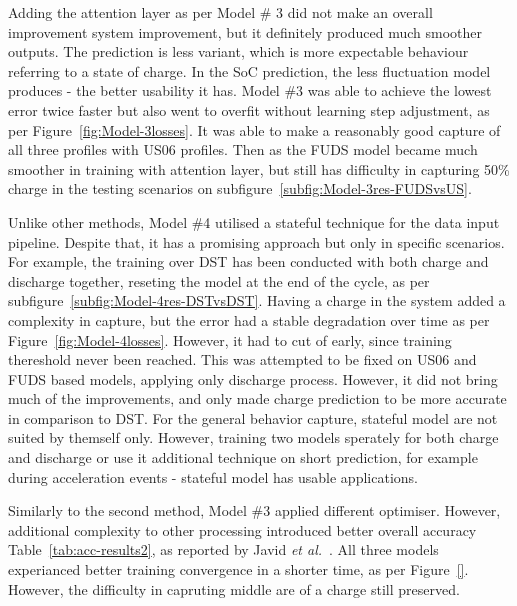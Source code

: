 %
%
Adding the attention layer as per Model \# 3 did not make an overall improvement system improvement, but it definitely produced much smoother outputs.
The prediction is less variant, which is more expectable behaviour referring to a state of charge.
In the SoC prediction, the less fluctuation model produces - the better usability it has.
Model \#3 was able to achieve the lowest error twice faster but also went to overfit without learning step adjustment, as per Figure~\ref{fig:Model-3losses}.
It was able to make a reasonably good capture of all three profiles with US06 profiles.
Then as the FUDS model became much smoother in training with attention layer, but still has difficulty in capturing 50\% charge in the testing scenarios on subfigure~\ref{subfig:Model-3res-FUDSvsUS}. 

%
%
Unlike other methods, Model \#4 utilised a stateful technique for the data input pipeline.
Despite that, it has a promising approach but only in specific scenarios.
For example, the training over DST has been conducted with both charge and discharge together, reseting the model at the end of the cycle, as per subfigure~\ref{subfig:Model-4res-DSTvsDST}.
Having a charge in the system added a complexity in capture, but the error had a stable degradation over time as per Figure~\ref{fig:Model-4losses}.
However, it had to cut of early, since training thereshold never been reached.
This was attempted to be fixed on US06 and FUDS based models, applying only discharge process.
However, it did not bring much of the improvements, and only made charge prediction to be more accurate in comparison to DST.
For the general behavior capture, stateful model are not suited by themself only.
However, training two models sperately for both charge and discharge or use it additional technique on short prediction, for example during acceleration events - stateful model has usable applications.

%
%
Similarly to the second method, Model \#3 applied different optimiser.
However, additional complexity to other processing introduced better overall accuracy Table~\ref{tab:acc-results2}, as reported by Javid \textit{et al.}~\cite{javid_adaptive_2020}.
All three models experianced better training convergence in a shorter time, as per Figure~\ref{}.
However, the difficulty in capruting middle are of a charge still preserved.

